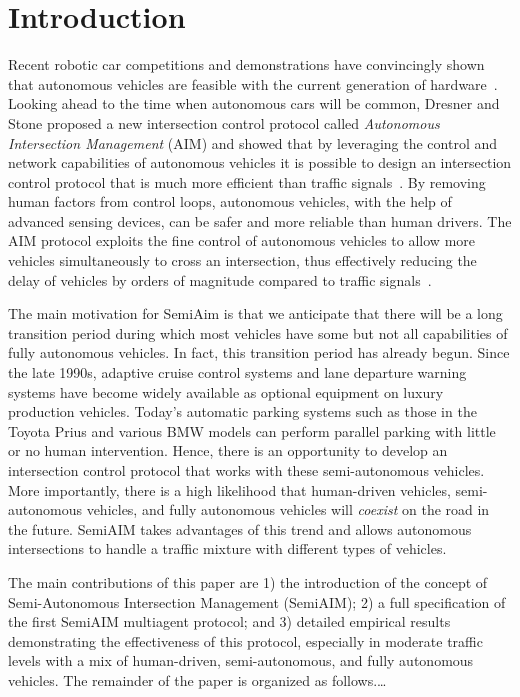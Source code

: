 \section{Introduction}

Recent robotic car competitions and demonstrations have convincingly
shown that autonomous vehicles are feasible with the current
generation of hardware~\cite{mybib:Darpa07Urban}. Looking ahead to the
time when autonomous cars will be common, Dresner and Stone proposed a
new intersection control protocol called \emph{Autonomous Intersection
  Management} (AIM) and showed that by leveraging the control and
network capabilities of autonomous vehicles it is possible to design
an intersection control protocol that is much more efficient than
traffic signals~\cite{bib:Dresner08Multiagent}.  By removing human
factors from control loops, autonomous vehicles, with the help of
advanced sensing devices, can be safer and more reliable than human
drivers.  The AIM protocol exploits the fine control of autonomous
vehicles to allow more vehicles simultaneously to cross an
intersection, thus effectively reducing the delay of vehicles by
orders of magnitude compared to traffic
signals~\cite{bib:Fajardo12Automated}.

The main motivation for SemiAim is that we anticipate that there will
be a long transition period during which most vehicles have some but
not all capabilities of fully autonomous vehicles.  In fact, this
transition period has already begun. Since the late 1990s, adaptive
cruise control systems and lane departure warning systems have become
widely available as optional equipment on luxury production vehicles.
Today's automatic parking systems such as those in the Toyota Prius
and various BMW models can perform parallel parking with little or no
human intervention.  Hence, there is an opportunity to develop an
intersection control protocol that works with these semi-autonomous
vehicles.  More importantly, there is a high likelihood that
human-driven vehicles, semi-autonomous vehicles, and fully
autonomous vehicles will \emph{coexist} on the road in the future.
SemiAIM takes advantages of this trend and allows autonomous
intersections to handle a traffic mixture with different types of
vehicles.

The main contributions of this paper are 1) the introduction of the
concept of Semi-Autonomous Intersection Management (SemiAIM); 2) a
full specification of the first SemiAIM multiagent protocol; and 3)
detailed empirical results demonstrating the effectiveness of this
protocol, especially in moderate traffic levels with a mix of
human-driven, semi-autonomous, and fully autonomous vehicles.  The
remainder of the paper is organized as follows.\ldots

